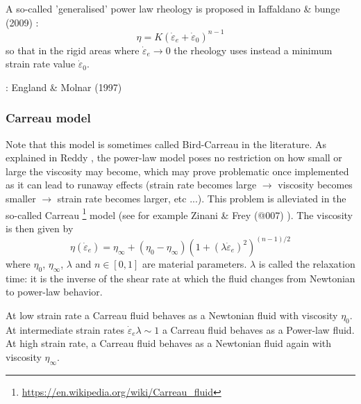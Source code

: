 A so-called 'generalised' power law rheology is proposed in Iaffaldano \& bunge (2009) \cite{iabu09}:
\begin{equation}
\eta = K (\dot{\varepsilon}_{e}+\dot{\varepsilon}_0)^{n-1}
\end{equation}
so that in the rigid areas where $\dot{\varepsilon}_e \rightarrow 0$ the rheology 
uses instead a minimum strain rate value $\dot{\varepsilon}_0$.

\Literature: England \& Molnar (1997) \cite{enmo97}

\subsubsection{Carreau model}

Note that this model is sometimes called Bird-Carreau in the literature. 
As explained in Reddy \cite{reddybook2}, the power-law model poses no restriction on 
how small or large the viscosity may become, which may prove problematic once 
implemented as it can lead to runaway effects (strain rate becomes large $\rightarrow$
viscosity becomes smaller $\rightarrow$ strain rate becomes larger, etc ...).
This problem is alleviated in the so-called Carreau
\footnote{\url{https://en.wikipedia.org/wiki/Carreau_fluid}} model 
(see for example Zinani \& Frey (@007) \cite{zifr07}). 
The viscosity is then given by
\begin{equation}
\eta(\dot{\varepsilon}_{e}) = \eta_\infty + (\eta_0-\eta_\infty) \left(1 + (\lambda \dot{\varepsilon}_{e})^2 \right)^{(n-1)/2}
\end{equation}
where $\eta_0$, $\eta_\infty$, $\lambda$ and $n\in[0,1]$ are material parameters. 
$\lambda$ is called the relaxation time: it is the inverse of the shear rate at which 
the fluid changes from Newtonian to power-law behavior.

At low strain rate a Carreau fluid behaves as a Newtonian fluid with viscosity $\eta_0$.
At intermediate strain rates $\dot{\varepsilon}_{e} \lambda \sim 1$ a Carreau fluid behaves 
as a Power-law fluid. At high strain rate, a Carreau fluid behaves as a Newtonian fluid 
again with viscosity $\eta_\infty$.
 
